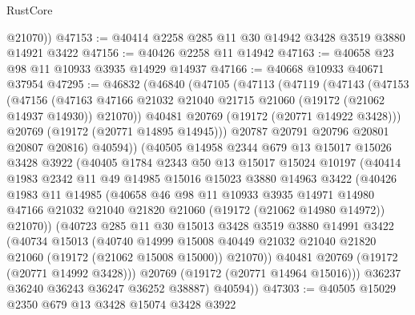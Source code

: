 \begin{lexlean}{RustCore}
\begin{coremodule}
        @21070))
@47153 := @40414 @2258 @285 @11 @30 @14942 @3428 @3519 @3880 @14921 @3422
@47156 := @40426 @2258 @11 @14942
@47163 := @40658 @23 @98 @11 @10933 @3935 @14929 @14937
@47166 := @40668 @10933 @40671 @37954
@47295 := @46832
    (@46840
      (@47105
        (@47113
          (@47119
            (@47143
              (@47153
                (@47156
                  (@47163
                    @47166
                    @21032
                    @21040
                    @21715
                    @21060
                    (@19172 (@21062 @14937 @14930))
                    @21070))
                @40481
                @20769
                (@19172 (@20771 @14922 @3428)))
              @20769
              (@19172 (@20771 @14895 @14945)))
            @20787
            @20791
            @20796
            @20801
            @20807
            @20816)
          @40594))
      (@40505
        @14958
        @2344
        @679
        @13
        @15017
        @15026
        @3428
        @3922
        (@40405
          @1784
          @2343
          @50
          @13
          @15017
          @15024
          @10197
          (@40414
            @1983
            @2342
            @11
            @49
            @14985
            @15016
            @15023
            @3880
            @14963
            @3422
            (@40426
              @1983
              @11
              @14985
              (@40658
                @46
                @98
                @11
                @10933
                @3935
                @14971
                @14980
                @47166
                @21032
                @21040
                @21820
                @21060
                (@19172 (@21062 @14980 @14972))
                @21070))
            (@40723
              @285
              @11
              @30
              @15013
              @3428
              @3519
              @3880
              @14991
              @3422
              (@40734
                @15013
                (@40740
                  @14999
                  @15008
                  @40449
                  @21032
                  @21040
                  @21820
                  @21060
                  (@19172 (@21062 @15008 @15000))
                  @21070))
              @40481
              @20769
              (@19172 (@20771 @14992 @3428)))
            @20769
            (@19172 (@20771 @14964 @15016)))
          @36237
          @36240
          @36243
          @36247
          @36252
          @38887)
        @40594))
@47303 := @40505 @15029 @2350 @679 @13 @3428 @15074 @3428 @3922

\end{coremodule}
\end{lexlean}
